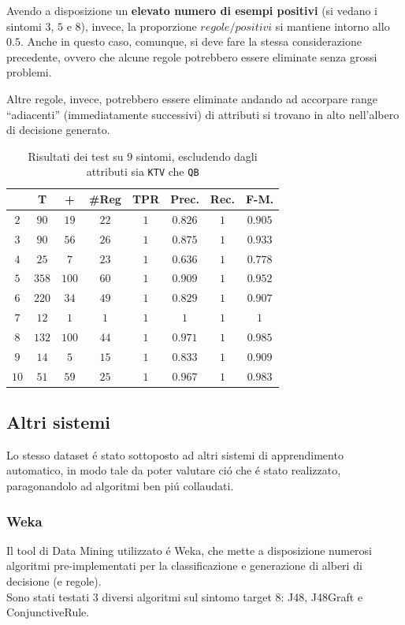 \documentclass[preprint]{acm_proc_article-sp}
\begin{document}
Avendo a disposizione un \textbf{elevato numero di esempi positivi} (si vedano i sintomi $3$, $5$ e $8$), invece, la proporzione $regole/positivi$ si mantiene intorno allo $0.5$. Anche in questo caso, comunque, si deve fare la stessa considerazione precedente, ovvero che alcune regole potrebbero essere eliminate senza grossi problemi.

Altre regole, invece, potrebbero essere eliminate andando ad accorpare range ``adiacenti'' (immediatamente successivi) di attributi si trovano in alto nell'albero di decisione generato.

\begin{table}[h]
\centering
\begin{tabular}{|c|c|c|c|c|c|c|c|} \hline
& \textbf{T} &\textbf{+} &\textbf{\#Reg} &\textbf{TPR} &\textbf{Prec.} &\textbf{Rec.} &\textbf{F-M.}  \\ \hline \hline
$2$	&$90$	&$19$	&$22$	&$1$	&$0.826$	&$1$	&$0.905$	\\ \hline
$3$ &$90$	&$56$	&$26$	&$1$	&$0.875$	&$1$	&$0.933$	\\ \hline
$4$ &$25$	&$7$	&$23$	&$1$	&$0.636$	&$1$	&$0.778$	\\ \hline
$5$ &$358$	&$100$	&$60$	&$1$	&$0.909$	&$1$	&$0.952$	\\ \hline
$6$ &$220$	&$34$	&$49$	&$1$	&$0.829$	&$1$	&$0.907$	\\ \hline
$7$ &$12$	&$1$	&$1$	&$1$	&$1$		&$1$	&$1$		\\ \hline
$8$ &$132$	&$100$	&$44$	&$1$	&$0.971$	&$1$	&$0.985$	\\ \hline
$9$	&$14$	&$5$	&$15$	&$1$	&$0.833$	&$1$	&$0.909$	\\ \hline
$10$&$51$	&$59$	&$25$	&$1$	&$0.967$	&$1$	&$0.983$	\\
\hline\end{tabular}
\caption{Risultati dei test su $9$ sintomi, escludendo dagli attributi sia \texttt{KTV} che \texttt{QB}}
\label{table:risultati-test}
\end{table}

\subsection{Altri sistemi}
Lo stesso dataset \'e stato sottoposto ad altri sistemi di apprendimento automatico, in modo tale da poter valutare ci\'o che \'e stato realizzato, paragonandolo ad algoritmi ben pi\'u collaudati.

\subsubsection{Weka}
Il tool di Data Mining utilizzato \'e Weka\cite{Weka:2014:Online}, che mette a disposizione numerosi algoritmi pre-implementati per la classificazione e generazione di alberi di decisione (e regole).\\
Sono stati testati $3$ diversi algoritmi sul sintomo target $8$: J48, J48Graft e ConjunctiveRule.
\end{document}
